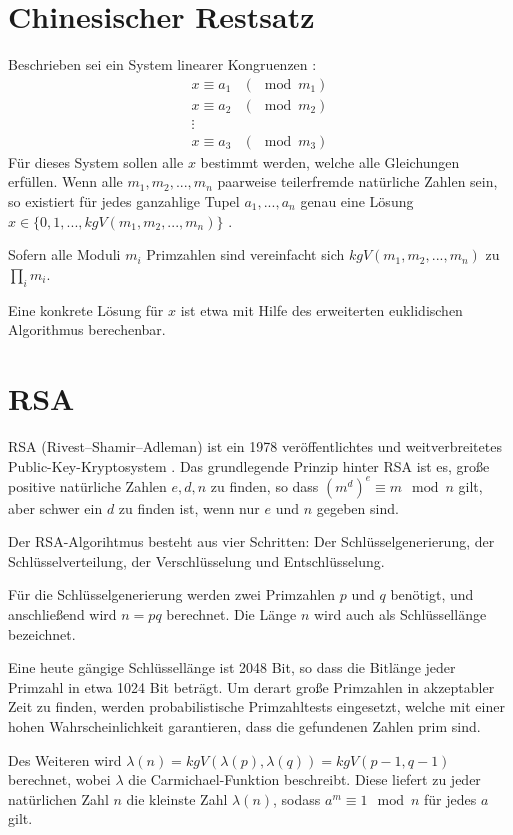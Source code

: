 \section{Chinesischer Restsatz}
\label{chinese_remainder}

Beschrieben sei ein System linearer Kongruenzen \cite{CRTref}:
\begin{align*}
x \equiv a_1 &(\mod m_1)\\
x \equiv a_2 &(\mod m_2)\\
\vdots\\
x \equiv a_3 &(\mod m_3)
\end{align*}
Für dieses System sollen alle $x$ bestimmt werden, welche alle Gleichungen erfüllen.
Wenn alle $m_1,m_2,...,m_n$ paarweise teilerfremde natürliche Zahlen sein, so existiert für jedes ganzahlige Tupel $a_1, ..., a_n$ genau eine Lösung $x \in \{0,1,...,kgV(m_1,m_2,...,m_n)\}$ \cite{CRTwiki}.

Sofern alle Moduli $m_i$ Primzahlen sind vereinfacht sich $kgV(m_1,m_2,...,m_n)$ zu $\prod_i m_i$.

Eine konkrete Lösung für $x$ ist etwa mit Hilfe des erweiterten euklidischen Algorithmus berechenbar.

\section{RSA}

RSA (Rivest–Shamir–Adleman) ist ein 1978 veröffentlichtes und weitverbreitetes Public-Key-Kryptosystem \cite{RSAPaper}.
Das grundlegende Prinzip hinter RSA ist es,  große positive natürliche Zahlen $e,d,n$ zu finden, so dass $(m^d)^e \equiv m \mod n$ gilt, aber schwer ein $d$ zu finden ist, wenn nur $e$ und $n$ gegeben sind.

Der RSA-Algorihtmus besteht aus vier Schritten: Der Schlüsselgenerierung, der Schlüsselverteilung, der Verschlüsselung und Entschlüsselung.

Für die Schlüsselgenerierung werden zwei Primzahlen $p$ und $q$ benötigt, und anschließend wird $n = pq$ berechnet. Die Länge $n$ wird auch als Schlüssellänge bezeichnet.

Eine heute gängige Schlüssellänge ist 2048 Bit, so dass die Bitlänge jeder Primzahl in etwa 1024 Bit beträgt. 
Um derart große Primzahlen in akzeptabler Zeit zu finden, werden probabilistische Primzahltests eingesetzt, welche mit einer hohen Wahrscheinlichkeit garantieren, dass die gefundenen Zahlen prim sind.

Des Weiteren wird $\lambda(n) = kgV(\lambda(p),\lambda(q)) = kgV(p-1, q-1)$ berechnet, wobei $\lambda$ die Carmichael-Funktion beschreibt.
Diese liefert zu jeder natürlichen Zahl $n$ die kleinste Zahl $\lambda(n)$, sodass $a^m \equiv 1 \mod n$ für jedes $a$ gilt.

